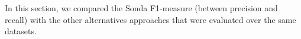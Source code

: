 In this section, we compared the Sonda F1-measure (between precision and recall) with the other alternatives approaches that were evaluated over the same datasets.



 

 